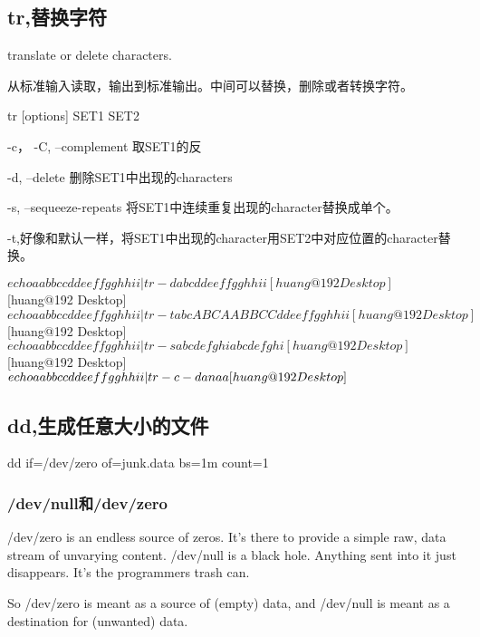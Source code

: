 \subsection{tr,替换字符}
translate or delete characters.

从标准输入读取，输出到标准输出。中间可以替换，删除或者转换字符。

\begin{Command-Line}
tr [options] SET1 SET2
\end{Command-Line}

-c， -C, --complement 取SET1的反

-d, --delete 删除SET1中出现的characters

-s, --sequeeze-repeats 将SET1中连续重复出现的character替换成单个。

-t,好像和默认一样，将SET1中出现的character用SET2中对应位置的character替换。

\begin{Command-Line}
$ echo aabbccddeeffgghhii | tr -d abc
ddeeffgghhii
[huang@192 Desktop]$ 
[huang@192 Desktop]$ echo aabbccddeeffgghhii | tr -t abc ABC
AABBCCddeeffgghhii
[huang@192 Desktop]$ 
[huang@192 Desktop]$ echo aabbccddeeffgghhii | tr -s abcdefghi
abcdefghi
[huang@192 Desktop]$ 
[huang@192 Desktop]$ echo aabbccddeeffgghhii | tr -c -d a\\n
aa
[huang@192 Desktop]$ 
\end{Command-Line}

\subsection{dd,生成任意大小的文件}

\begin{Bash}

dd if=/dev/zero of=junk.data bs=1m count=1

\end{Bash}

\subsubsection{/dev/null和/dev/zero}

/dev/zero is an endless source of zeros. It's there to provide a simple raw, data stream of unvarying content. /dev/null is a black hole. Anything sent into it just disappears. It's the programmers trash can.

So /dev/zero is meant as a source of (empty) data, and /dev/null is meant as a destination for (unwanted) data.

